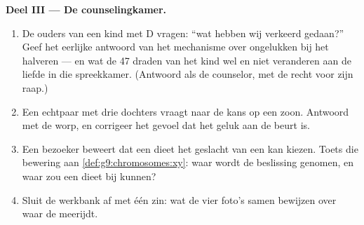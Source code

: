 \begin{problem}
\medskip\noindent\textbf{Deel III --- De
counselingkamer.}
\begin{enumerate}[resume]
  \item De ouders van een kind met  D vragen: ``wat
        hebben wij verkeerd gedaan?'' Geef het eerlijke antwoord
        van het mechanisme over ongelukken bij het halveren ---
        en wat de 47 draden van het kind wel en niet veranderen
        aan de liefde in die spreekkamer. (Antwoord als de counselor,
        met de  recht voor zijn raap.)
  \item Een echtpaar met drie dochters vraagt naar de kans op
        een zoon. Antwoord met de worp, en corrigeer het gevoel
        dat het geluk aan de beurt is.
  \item Een bezoeker beweert dat een dieet het geslacht van een
         kan kiezen. Toets die bewering aan
        \cref{def:g9:chromosomes:xy}: waar wordt de beslissing
        genomen, en waar zou een dieet bij kunnen?
  \item Sluit de werkbank af met één zin: wat de vier foto's
        samen bewijzen over waar de  meerijdt.
\end{enumerate}
\end{problem}

